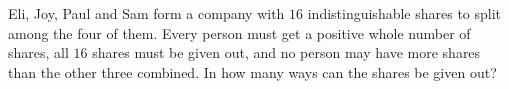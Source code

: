 Eli, Joy, Paul and Sam form a company with $16$ indistinguishable shares to split among the four of them. Every person must get a positive whole number of shares, all $16$ shares must be given out, and no person may have more shares than the other three combined. In how many ways can the shares be given out?
